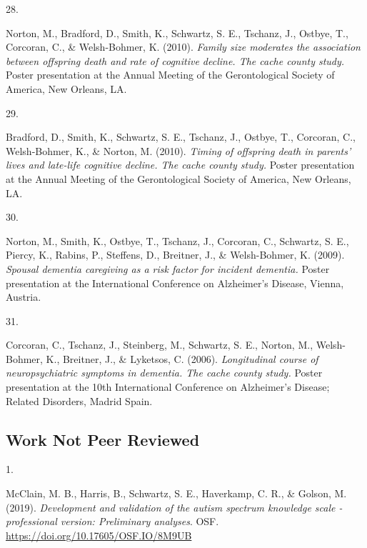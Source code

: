 \documentclass[11pt,a4paper,]{moderncv}
\newlength{\csllabelwidth}
\newcommand{\CSLLeftMargin}[1]{\parbox[t]{\csllabelwidth}{#1}}
\newcommand{\CSLRightInline}[1]{\parbox[t]{\linewidth - \csllabelwidth}{#1}}
\begin{document}
\leavevmode{}%
\CSLLeftMargin{28. }
\CSLRightInline{Norton, M., Bradford, D., Smith, K., Schwartz, S. E.,
Tschanz, J., Ostbye, T., Corcoran, C., \& Welsh-Bohmer, K. (2010).
\emph{Family size moderates the association between offspring death and
rate of cognitive decline. The cache county study.} Poster presentation
at the Annual Meeting of the Gerontological Society of America, New
Orleans, LA.}

\leavevmode{}%
\CSLLeftMargin{29. }
\CSLRightInline{Bradford, D., Smith, K., Schwartz, S. E., Tschanz, J.,
Ostbye, T., Corcoran, C., Welsh-Bohmer, K., \& Norton, M. (2010).
\emph{Timing of offspring death in parents' lives and late-life
cognitive decline. The cache county study.} Poster presentation at the
Annual Meeting of the Gerontological Society of America, New Orleans,
LA.}

\leavevmode{}%
\CSLLeftMargin{30. }
\CSLRightInline{Norton, M., Smith, K., Ostbye, T., Tschanz, J.,
Corcoran, C., Schwartz, S. E., Piercy, K., Rabins, P., Steffens, D.,
Breitner, J., \& Welsh-Bohmer, K. (2009). \emph{Spousal dementia
caregiving as a risk factor for incident dementia.} Poster presentation
at the International Conference on Alzheimer's Disease, Vienna,
Austria.}

\leavevmode{}%
\CSLLeftMargin{31. }
\CSLRightInline{Corcoran, C., Tschanz, J., Steinberg, M., Schwartz, S.
E., Norton, M., Welsh-Bohmer, K., Breitner, J., \& Lyketsos, C. (2006).
\emph{Longitudinal course of neuropsychiatric symptoms in dementia. The
cache county study.} Poster presentation at the 10th International
Conference on Alzheimer's Disease; Related Disorders, Madrid Spain.}

\vspace{7mm}

\hypertarget{work-not-peer-reviewed}{%
\subsection{\texorpdfstring{\textbf{Work Not Peer
Reviewed}}{Work Not Peer Reviewed}}\label{work-not-peer-reviewed}}

\hypertarget{refs_notpeer}{}
\leavevmode{}%
\CSLLeftMargin{1. }
\CSLRightInline{McClain, M. B., Harris, B., Schwartz, S. E., Haverkamp,
C. R., \& Golson, M. (2019). \emph{Development and validation of the
autism spectrum knowledge scale - professional version: Preliminary
analyses}. OSF. \url{https://doi.org/10.17605/OSF.IO/8M9UB}}
\end{document}
